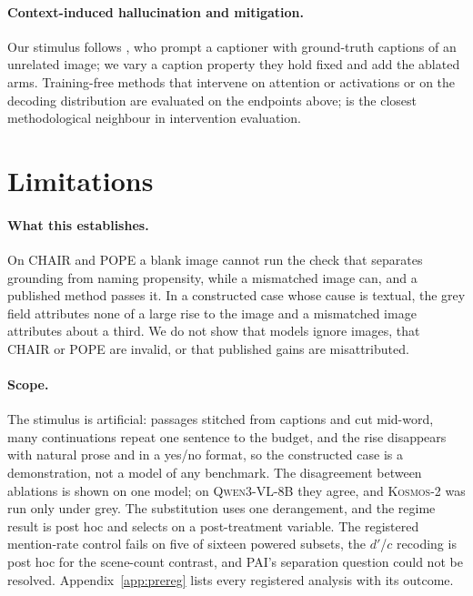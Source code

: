 \documentclass{article} %
\begin{document}
\paragraph{Context-induced hallucination and mitigation.} Our stimulus follows \citet{shortcut}, who
prompt a captioner with ground-truth captions of an unrelated image; we vary a caption property they
hold fixed and add the ablated arms. Training-free methods that intervene on attention or activations
\citep{pai, vista, cai, savaa, regionaware, adaiat} or on the decoding distribution \citep{vcd} are
evaluated on the endpoints above; \citet{axbench} is the closest methodological neighbour in
intervention evaluation.

\section{Limitations}
\label{sec:limits}

\paragraph{What this establishes.} On CHAIR and POPE a blank image cannot run the check that separates
grounding from naming propensity, while a mismatched image can, and a published method passes it. In a
constructed case whose cause is textual, the grey field attributes none of a large rise to the image and
a mismatched image attributes about a third. We do not show that models ignore images, that CHAIR or
POPE are invalid, or that published gains are misattributed.

\paragraph{Scope.} The stimulus is artificial: passages stitched from captions and cut mid-word, many
continuations repeat one sentence to the budget, and the rise disappears with natural prose and in a
yes/no format, so the constructed case is a demonstration, not a model of any benchmark. The
disagreement between ablations is shown on one model; on \textsc{Qwen3-VL-8B} they agree, and
\textsc{Kosmos-2} was run only under grey. The substitution uses one derangement, and the regime result
is post hoc and selects on a post-treatment variable. The registered mention-rate control fails on five
of sixteen powered subsets, the $d'$/$c$ recoding is post hoc for the scene-count contrast, and PAI's
separation question could not be resolved. Appendix~\ref{app:prereg} lists every registered analysis
with its outcome.
\end{document}
